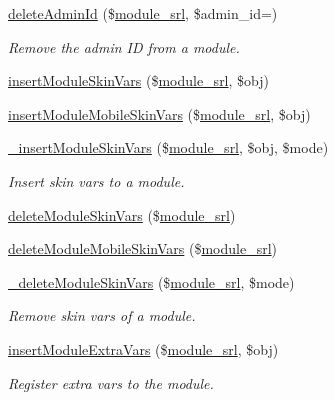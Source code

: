 \begin{DoxyCompactItemize}
\hyperlink{classmoduleController_a1a9115a9e85acd2b26229e36ba29daf4}{delete\+Admin\+Id} (\$\hyperlink{ko_8install_8php_a370bb6450fab1da3e0ed9f484a38b761}{module\+\_\+srl}, \$admin\+\_\+id=\textquotesingle{}\textquotesingle{})
\begin{DoxyCompactList}\small\item\em Remove the admin ID from a module. \end{DoxyCompactList}\item 
\hyperlink{classmoduleController_ad044df4dde2053b5dcbaf5077822290c}{insert\+Module\+Skin\+Vars} (\$\hyperlink{ko_8install_8php_a370bb6450fab1da3e0ed9f484a38b761}{module\+\_\+srl}, \$obj)
\item 
\hyperlink{classmoduleController_a6c7aab59734028d1c980053a75437a45}{insert\+Module\+Mobile\+Skin\+Vars} (\$\hyperlink{ko_8install_8php_a370bb6450fab1da3e0ed9f484a38b761}{module\+\_\+srl}, \$obj)
\item 
\hyperlink{classmoduleController_aea2dfb4f6a1d31acdbebf131058494cd}{\+\_\+insert\+Module\+Skin\+Vars} (\$\hyperlink{ko_8install_8php_a370bb6450fab1da3e0ed9f484a38b761}{module\+\_\+srl}, \$obj, \$mode)
\begin{DoxyCompactList}\small\item\em Insert skin vars to a module. \end{DoxyCompactList}\item 
\hyperlink{classmoduleController_ad85915b5cf2a31804f673cfc3320ac75}{delete\+Module\+Skin\+Vars} (\$\hyperlink{ko_8install_8php_a370bb6450fab1da3e0ed9f484a38b761}{module\+\_\+srl})
\item 
\hyperlink{classmoduleController_a16feed706aef2613cc417c68cb06ba8a}{delete\+Module\+Mobile\+Skin\+Vars} (\$\hyperlink{ko_8install_8php_a370bb6450fab1da3e0ed9f484a38b761}{module\+\_\+srl})
\item 
\hyperlink{classmoduleController_a88baeaa3755f270af223e17e7a96d20a}{\+\_\+delete\+Module\+Skin\+Vars} (\$\hyperlink{ko_8install_8php_a370bb6450fab1da3e0ed9f484a38b761}{module\+\_\+srl}, \$mode)
\begin{DoxyCompactList}\small\item\em Remove skin vars of a module. \end{DoxyCompactList}\item 
\hyperlink{classmoduleController_a1a8373bfcd3e1e8bc88f41bb777ad486}{insert\+Module\+Extra\+Vars} (\$\hyperlink{ko_8install_8php_a370bb6450fab1da3e0ed9f484a38b761}{module\+\_\+srl}, \$obj)
\begin{DoxyCompactList}\small\item\em Register extra vars to the module. \end{DoxyCompactList}\item 

\end{DoxyCompactItemize}
